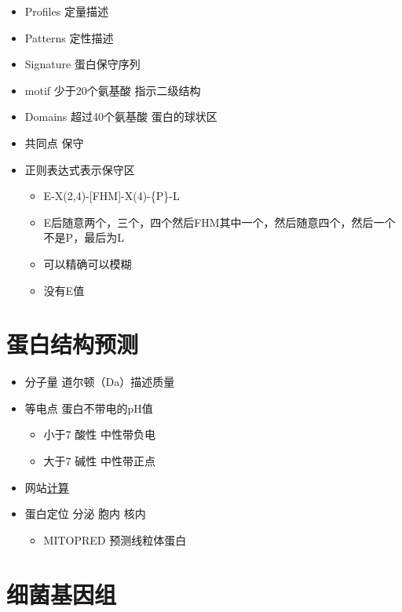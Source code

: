 \documentclass[
]{book}
\providecommand{\tightlist}{%
  \setlength{\itemsep}{0pt}\setlength{\parskip}{0pt}}
\begin{document}
\begin{itemize}
\tightlist
\item
  Profiles 定量描述
\item
  Patterns 定性描述
\item
  Signature 蛋白保守序列
\item
  motif 少于20个氨基酸 指示二级结构
\item
  Domains 超过40个氨基酸 蛋白的球状区
\item
  共同点 保守
\item
  正则表达式表示保守区

  \begin{itemize}
  \tightlist
  \item
    E-X(2,4)-{[}FHM{]}-X(4)-\{P\}-L
  \item
    E后随意两个，三个，四个然后FHM其中一个，然后随意四个，然后一个不是P，最后为L
  \item
    可以精确可以模糊
  \item
    没有E值
  \end{itemize}
\end{itemize}

\hypertarget{ux86cbux767dux7ed3ux6784ux9884ux6d4b}{%
\section{蛋白结构预测}\label{ux86cbux767dux7ed3ux6784ux9884ux6d4b}}

\begin{itemize}
\tightlist
\item
  分子量 道尔顿（Da）描述质量
\item
  等电点 蛋白不带电的pH值

  \begin{itemize}
  \tightlist
  \item
    小于7 酸性 中性带负电
  \item
    大于7 碱性 中性带正点
  \end{itemize}
\item
  网站\href{http://web.expasy.org/compute_pi/}{计算}
\item
  蛋白定位 分泌 胞内 核内

  \begin{itemize}
  \tightlist
  \item
    MITOPRED 预测线粒体蛋白
  \end{itemize}
\end{itemize}

\hypertarget{ux7ec6ux83ccux57faux56e0ux7ec4}{%
\section{细菌基因组}\label{ux7ec6ux83ccux57faux56e0ux7ec4}}
\end{document}
